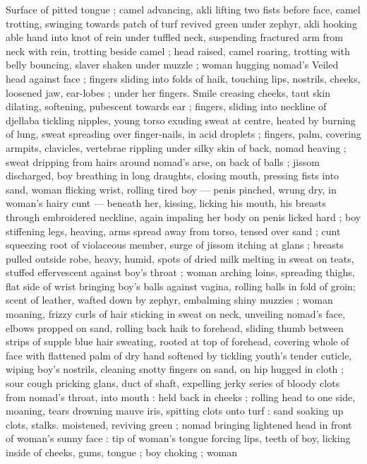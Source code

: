 Surface of pitted tongue ; camel advancing, akli lifting two fists
before face, camel trotting, swinging towards patch of turf revived
green under zephyr, akli hooking able hand into knot of rein under
tuffled neck, suspending fractured arm from neck with rein, trotting
beside camel ; head raised, camel roaring, trotting with belly
bouncing, slaver shaken under muzzle ; woman hugging nomad’s
Veiled head against face ; fingers sliding into folds of haik, touching
lips, nostrils, cheeks, loosened jaw, ear-lobes ; under her fingers.
Smile creasing cheeks, taut skin dilating, softening, pubescent
towards ear ; fingers, sliding into neckline of djellaba tickling
nipples, young torso exuding sweat at centre, heated by burning of
lung, sweat spreading over finger-nails, in acid droplets ; fingers,
palm, covering armpits, clavicles, vertebrae rippling under silky skin
of back, nomad heaving ; sweat dripping from hairs around nomad’s
arse, on back of balls ; jissom discharged, boy breathing in long
draughts, closing mouth, pressing fists into sand, woman flicking
wrist, rolling tired boy --- penis pinched, wrung dry, in woman's hairy
cunt --- beneath her, kissing, licking his mouth, his breasts through
embroidered neckline, again impaling her body on penis licked hard
; boy stiffening legs, heaving, arms spread away from torso, tensed
over sand ; cunt squeezing root of violaceous member, surge of
jissom itching at glans ; breasts pulled outside robe, heavy, humid,
spots of dried milk melting in sweat on teats, stuffed effervescent
against boy's throat ; woman arching loins, spreading thighs, flat
side of wrist bringing boy's balls against vagina, rolling balls in fold
of groin; scent of leather, wafted down by zephyr, embalming shiny
muzzies ; woman moaning, frizzy curls of hair sticking in sweat on
neck, unveiling nomad’s face, elbows propped on sand, rolling back
haik to forehead, sliding thumb between strips of supple blue hair
sweating, rooted at top of forehead, covering whole of face with
flattened palm of dry hand softened by tickling youth's tender
cuticle, wiping boy's nostrils, cleaning snotty fingers on sand, on hip
hugged in cloth ; sour cough pricking glans, duct of shaft, expelling
jerky series of bloody clots from nomad's throat, into mouth : held
back in cheeks ; rolling head to one side, moaning, tears drowning
mauve iris, spitting clots onto turf : sand soaking up clots, stalks.
moistened, reviving green ; nomad bringing lightened head in front
of woman's sunny face : tip of woman's tongue forcing lips, teeth of
boy, licking inside of cheeks, gums, tongue ; boy choking ; woman
